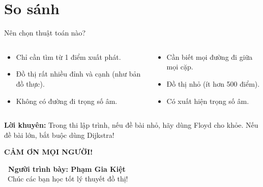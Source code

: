 \documentclass{beamer}
\begin{document}
\section{So sánh}
\begin{frame}{Nên chọn thuật toán nào?}

\begin{columns}

\begin{tcolorbox}[title=\faBolt \ Dùng Dijkstra khi...]
\begin{itemize}
    \item[\faMapMarker*] Chỉ cần tìm từ 1 điểm xuất phát.
    \item[\faHashtag] Đồ thị rất nhiều đỉnh và cạnh (như bản đồ thực).
    \item[\faBan] Không có đường đi trọng số âm.
\end{itemize}
\end{tcolorbox}

\begin{tcolorbox}[title=\faLayerGroup \ Dùng Floyd khi...]
\begin{itemize}
    \item[\faObjectGroup] Cần biết mọi đường đi giữa mọi cặp.
    \item[\faExpandArrowsAlt] Đồ thị nhỏ (ít hơn 500 điểm).
    \item[\faCheckDouble] Có xuất hiện trọng số âm.
\end{itemize}
\end{tcolorbox}

\end{columns}

\vspace{0.4cm}
\begin{tcolorbox}[colframe=main2, center title]
\centering
\textbf{\faStar Lời khuyên:} Trong thi lập trình, nếu đề bài nhỏ, hãy dùng Floyd cho khỏe. Nếu đề bài lớn, bắt buộc dùng Dijkstra!
\end{tcolorbox}

\end{frame}

\begin{frame}
\centering
\begin{tcolorbox}[colback=main2!10, colframe=main2, arc=5mm, center]
\centering
\Huge \textcolor{main2}{\textbf{CẢM ƠN MỌI NGƯỜI!}}
\end{tcolorbox}

\vspace{0.5cm}
\textbf{\faUser \ Người trình bày: Phạm Gia Kiệt} \\
\vspace{0.2cm}
\faGamepad \ Chúc các bạn học tốt lý thuyết đồ thị!
\end{frame}
\end{document}
